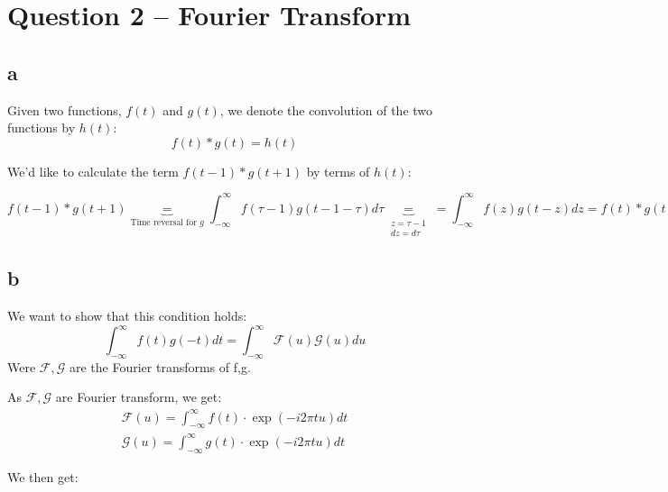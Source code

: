 \documentclass[english]{extarticle}
\numberwithin{equation}{section}
\numberwithin{figure}{section}
\begin{document}
\newpage
\section*{Question 2 -- Fourier Transform}

\subsection*{a}

Given two functions, $f(t)$ and $g(t)$, we denote the convolution of the two functions by $h(t)$: 
\begin{equation*}
    f(t) * g(t) = h(t)    
\end{equation*}

We'd like to calculate the term $f(t-1) * g(t+1)$ by terms of $h(t)$:

\begin{equation*}
    f(t-1) * g(t+1) \underbrace{=}_{\text{Time reversal for }g} \int_{-\infty}^{\infty} f(\tau -1) g(t-1-\tau) d\tau \underbrace{=}_{\substack{z = \tau-1 \\ dz = d\tau}} = \int_{-\infty}^{\infty} f(z) g(t-z) dz = f(t) * g(t) = h(t)
\end{equation*}

\subsection*{b}

We want to show that this condition holds:
\begin{equation*}
    \int_{-\infty}^{\infty} f(t) g(-t) dt = \int_{-\infty}^{\infty} \mathcal{F}(u) \mathcal{G} (u) du
\end{equation*}
Were $\mathcal{F,G}$ are the Fourier transforms of f,g.

As $\mathcal{F,G}$ are Fourier transform, we get:
\begin{align*}
    \mathcal{F}(u) = \int_{-\infty}^{\infty} f(t)\cdot \exp(-i 2\pi t u) dt \\
    \mathcal{G}(u) = \int_{-\infty}^{\infty} g(t)\cdot \exp(-i 2\pi t u) dt 
\end{align*}

We then get:
\end{document}
